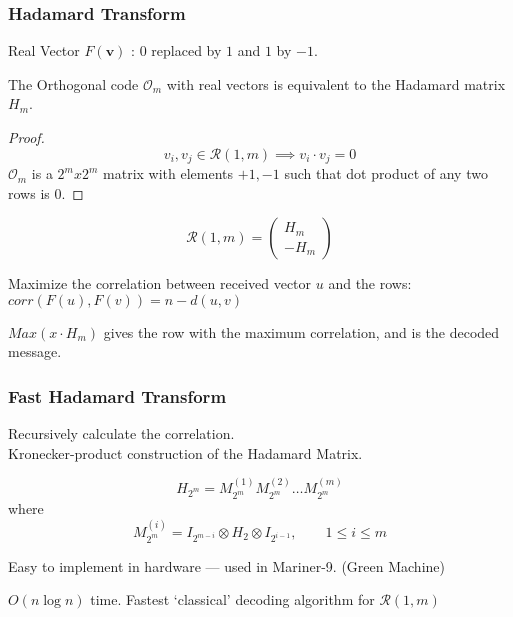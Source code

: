 \documentclass[xcolor=xvgnames]{beamer}
\newcommand{\RM}[2]{\ensuremath{\mathcal{R}(#1,#2)}}
\newcommand{\V}[1]{\ensuremath{\mathbf{#1}}}
\begin{document}
\begin{frame}
  \frametitle{Hadamard Transform}

\alert{Real Vector} $F(\V{v})$ : $0$ replaced by $1$ and $1$ by $-1$.

  \begin{Theorem}
  The Orthogonal code $\mathcal{O}_m$ with real vectors is equivalent to the Hadamard matrix $H_m$.
\begin{proof}
    \begin{equation*}
      v_i, v_j \in \RM{1}{m} \implies v_i\cdot v_j = 0
    \end{equation*}
$\mathcal{O}_m$ is a $2^m x 2^m$ matrix with elements $+1, -1$ such that dot product of any two rows is $0$.
\end{proof}
\end{Theorem}

\begin{equation*}
  \label{eq:3}
  \RM{1}{m} =
  \begin{pmatrix}
    H_m \\
    -H_m
  \end{pmatrix}
\end{equation*}

Maximize the correlation between received vector $u$ and the rows:  
$ corr(F(u),F(v)) = n - d(u,v) $

$Max(x \cdot H_m)$ gives the row with the maximum correlation, and is the
decoded message. 

\end{frame}



\begin{frame}
  \frametitle{Fast Hadamard Transform}

Recursively calculate the correlation. \\
Kronecker-product construction of the Hadamard Matrix. 

  \begin{equation*}
    H_{2^m} = M_{2^m}^{(1)}M_{2^m}^{(2)} \ldots M_{2^m}^{(m)}
\end{equation*}
 where 
 \begin{equation*}
  M_{2^m}^{(i)} = I_{2^{m-i}}\otimes H_2 \otimes I_{2^{i-1}}, \qquad 1 \leq i \leq m
  \end{equation*}

Easy to implement in hardware --- used in Mariner-9. (Green Machine)

$O(n\log{n})$ time. Fastest `classical' decoding algorithm for $\RM{1}{m}$
\end{frame}
\end{document}
